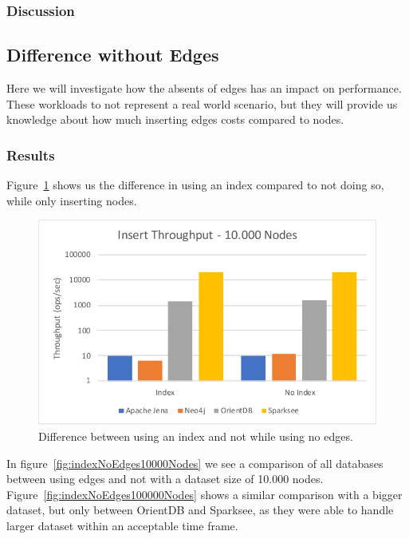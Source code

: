 \subsubsection{Discussion}

\subsection{Difference without Edges}
\label{ch:evaluation:se:differenceEdges}
Here we will investigate how the absents of edges has an impact on performance.
These workloads to not represent a real world scenario,
but they will provide us knowledge about how much inserting edges costs compared to nodes.

\subsubsection{Results}
Figure~\ref{fig:noEdges} shows us the difference in using an index compared to not doing so,
while only inserting nodes.

\begin{figure}[h!]
  \centering
  \includegraphics[width=.5\textwidth]{images/throughput/noEdges}
  \caption{Difference between using an index and not while using no edges.}
  \label{fig:noEdges}
\end{figure}

In figure~\ref{fig:indexNoEdges10000Nodes} we see a comparison of all databases between using edges and not with a dataset size of 10.000 nodes.
Figure~\ref{fig:indexNoEdges100000Nodes} shows a similar comparison with a bigger dataset,
but only between OrientDB and Sparksee,
as they were able to handle larger dataset within an acceptable time frame.


